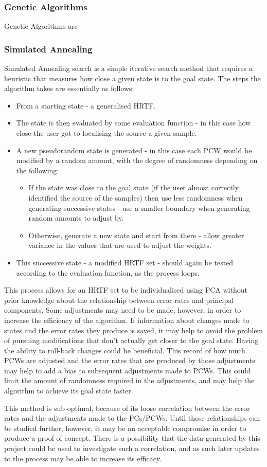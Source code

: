 \subsubsection{Genetic Algorithms}
Genetic Algorithms are 

\subsubsection{Simulated Annealing}
Simulated Annealing \citep{vanLaarhoven1987} search is a simple iterative search method that requires a heuristic that measures how close a given state is to the goal state. The steps the algorithm takes are essentially as follows:
\begin{itemize}
\item From a starting state - a generalised HRTF.
\item The state is then evaluated by some evaluation function - in this case how close the user got to localising the source a given sample.
\item A new pseudorandom state is generated - in this case each PCW would be modified by a random amount, with the degree of randomness depending on the following:
\begin{itemize}
\item If the state was close to the goal state (if the user almost correctly identified the source of the samples) then use less randomness when generating successive states - use a smaller boundary when generating random amounts to adjust by.
\item Otherwise, generate a new state and start from there - allow greater variance in the values that are used to adjust the weights. 
\end{itemize}
\item This successive state - a modified HRTF set - should again be tested according to the evaluation function, as the process loops. 
\end{itemize}

This process allows for an HRTF set to be individualised using PCA without prior knowledge about the relationship between error rates and principal components. Some adjustments may need to be made, however, in order to increase the efficiency of the algorithm. If information about changes made to states and the error rates they produce is saved, it may help to avoid the problem of pursuing modifications that don't actually get closer to the goal state. Having the ability to roll-back changes could be beneficial. This record of how much PCWs are adjusted and the error rates that are produced by those adjustments may help to add a bias to subsequent adjustments made to PCWs. This could limit the amount of randomness required in the adjustments, and may help the algorithm to achieve its goal state faster. 

This method is sub-optimal, because of its loose correlation between the error rates and the adjustments made to the PCs/PCWs. Until those relationships can be studied further, however, it may be an acceptable compromise in order to produce a proof of concept. There is a possibility that the data generated by this project could be used to investigate such a correlation, and as such later updates to the process may be able to increase its efficacy. 
